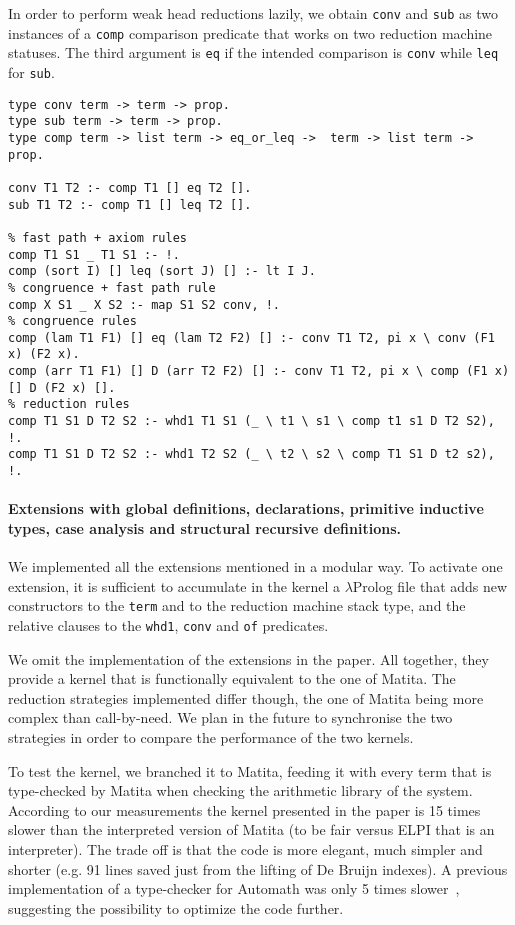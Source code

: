 In order to perform weak head reductions lazily, we obtain \verb+conv+ and \verb+sub+ as two instances of a \verb+comp+ comparison predicate that works on two reduction machine statuses. The third argument is \verb+eq+ if the intended comparison is \verb+conv+ while \verb+leq+ for \verb+sub+.
\begin{Verbatim}
type conv term -> term -> prop.
type sub term -> term -> prop.
type comp term -> list term -> eq_or_leq ->  term -> list term -> prop.

conv T1 T2 :- comp T1 [] eq T2 [].
sub T1 T2 :- comp T1 [] leq T2 [].

% fast path + axiom rules
comp T1 S1 _ T1 S1 :- !.
comp (sort I) [] leq (sort J) [] :- lt I J.
% congruence + fast path rule
comp X S1 _ X S2 :- map S1 S2 conv, !.
% congruence rules
comp (lam T1 F1) [] eq (lam T2 F2) [] :- conv T1 T2, pi x \ conv (F1 x) (F2 x).
comp (arr T1 F1) [] D (arr T2 F2) [] :- conv T1 T2, pi x \ comp (F1 x) [] D (F2 x) [].
% reduction rules
comp T1 S1 D T2 S2 :- whd1 T1 S1 (_ \ t1 \ s1 \ comp t1 s1 D T2 S2), !.
comp T1 S1 D T2 S2 :- whd1 T2 S2 (_ \ t2 \ s2 \ comp T1 S1 D t2 s2), !.
\end{Verbatim}

\paragraph{Extensions with global definitions, declarations, primitive inductive types, case analysis and structural recursive definitions.}
We implemented all the extensions mentioned in a modular way. To activate one extension, it is sufficient to accumulate in the kernel a $\lambda$Prolog file that adds new constructors to the \verb+term+ and to the reduction machine stack type, and the relative clauses to the \verb+whd1+, \verb+conv+ and \verb+of+ predicates.

We omit the implementation of the extensions in the paper. All together, they provide a kernel that is functionally equivalent to the one of Matita. The reduction strategies implemented differ though, the one of Matita being more complex than call-by-need. We plan in the future to synchronise the two strategies in order to compare the performance of the two kernels.

To test the kernel, we branched it to Matita, feeding it with every term that is type-checked by Matita when checking the arithmetic library of the system.
According to our measurements the kernel presented in the paper is 15 times slower than the interpreted version of Matita (to be fair versus ELPI that is an interpreter). The trade off is that the code is more elegant, much simpler and shorter (e.g. 91 lines saved just from the lifting of De Bruijn indexes). A previous implementation of a type-checker for Automath was only 5 times slower~\cite{elpiLPAR}, suggesting the possibility to optimize the code further.
